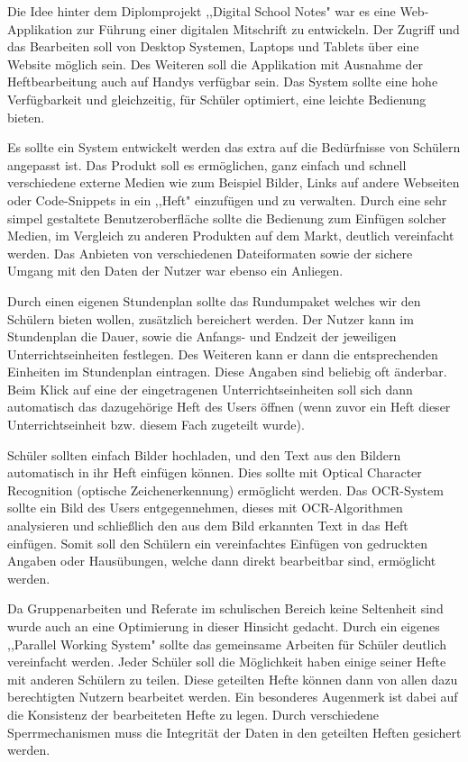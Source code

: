 Die Idee hinter dem Diplomprojekt ,,Digital School Notes" war es eine Web-Applikation zur Führung einer digitalen Mitschrift zu entwickeln. Der Zugriff und das Bearbeiten soll von Desktop Systemen, Laptops und Tablets über eine Website möglich sein. Des Weiteren soll die Applikation mit Ausnahme der Heftbearbeitung auch auf Handys verfügbar sein. Das System sollte eine hohe Verfügbarkeit und gleichzeitig, für Schüler optimiert, eine leichte Bedienung bieten. 

Es sollte ein System entwickelt werden das extra auf die Bedürfnisse von Schülern angepasst ist. Das Produkt soll es ermöglichen, ganz einfach und schnell verschiedene externe Medien wie zum Beispiel Bilder, Links auf andere Webseiten oder Code-Snippets in ein ,,Heft" einzufügen und zu verwalten. Durch eine sehr simpel gestaltete Benutzeroberfläche sollte die Bedienung zum Einfügen solcher Medien, im Vergleich zu anderen Produkten auf dem Markt, deutlich vereinfacht werden. Das Anbieten von verschiedenen Dateiformaten sowie der sichere Umgang mit den Daten der Nutzer war ebenso ein Anliegen.

Durch einen eigenen Stundenplan sollte das Rundumpaket welches wir den Schülern bieten wollen, zusätzlich bereichert werden. Der Nutzer kann im Stundenplan die Dauer, sowie die Anfangs- und Endzeit der jeweiligen Unterrichtseinheiten festlegen. Des Weiteren kann er dann die entsprechenden Einheiten im Stundenplan eintragen. Diese Angaben sind beliebig oft änderbar. Beim Klick auf eine der eingetragenen Unterrichtseinheiten soll sich dann automatisch das dazugehörige Heft des Users öffnen (wenn zuvor ein Heft dieser Unterrichtseinheit bzw. diesem Fach zugeteilt wurde).

Schüler sollten einfach Bilder hochladen, und den Text aus den Bildern automatisch in ihr Heft einfügen können. Dies sollte mit Optical Character Recognition (optische Zeichenerkennung) ermöglicht werden. Das OCR-System sollte ein Bild des Users entgegennehmen, dieses mit OCR-Algorithmen analysieren und schließlich den aus dem Bild erkannten Text in das Heft einfügen. Somit soll den Schülern ein vereinfachtes Einfügen von gedruckten Angaben oder Hausübungen, welche dann direkt bearbeitbar sind, ermöglicht werden.

Da Gruppenarbeiten und Referate im schulischen Bereich keine Seltenheit sind wurde auch an eine Optimierung in dieser Hinsicht gedacht. Durch ein eigenes ,,Parallel Working System" sollte das gemeinsame Arbeiten für Schüler deutlich vereinfacht werden. Jeder Schüler soll die Möglichkeit haben einige seiner Hefte mit anderen Schülern zu teilen. Diese geteilten Hefte können dann von allen dazu berechtigten Nutzern bearbeitet werden. Ein besonderes Augenmerk ist dabei auf die Konsistenz der bearbeiteten Hefte zu legen. Durch verschiedene Sperrmechanismen muss die Integrität der Daten in den geteilten Heften gesichert werden.

